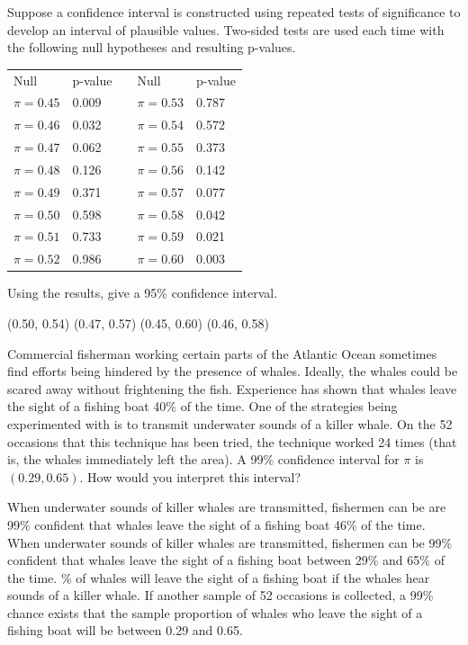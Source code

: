 \documentclass{article}
\begin{document}
\begin{mcquestions}
		\question Suppose a confidence interval is constructed using repeated tests of significance to develop an interval of plausible values.  Two-sided tests are used each time with the following null hypotheses and resulting p-values.
		\begin{center}
			\begin{tabular}{llp{.75in}ll}
				Null              & p-value & & Null              & p-value  \\
				$\pi = 0.45$ & 0.009   &                                 & $\pi = 0.53$ & 0.787    \\
				$\pi = 0.46$ & 0.032   &                                 & $\pi = 0.54$ & 0.572    \\
				$\pi = 0.47$ & 0.062   &                                 & $\pi = 0.55$ & 0.373    \\
				$\pi = 0.48$ & 0.126   &                                 & $\pi = 0.56$ & 0.142    \\
				$\pi = 0.49$ & 0.371   &                                 & $\pi = 0.57$ & 0.077    \\
				$\pi = 0.50$ & 0.598   &                                 & $\pi = 0.58$ & 0.042    \\
				$\pi = 0.51$ & 0.733   &                                 & $\pi = 0.59$ & 0.021    \\
				$\pi = 0.52$ & 0.986   &                                 & $\pi = 0.60$ & 0.003   
			\end{tabular}
		\end{center}
		Using the results, give a 95\% confidence interval.
		\begin{mcanswerslist}
			\answer (0.50, 0.54)
			\answer[correct] (0.47, 0.57)
			\answer (0.45, 0.60)
			\answer (0.46, 0.58)
		\end{mcanswerslist}
		
		\question Commercial fisherman working certain parts of the Atlantic Ocean sometimes find efforts being hindered by the presence of whales. Ideally, the whales could be scared away without frightening the fish. Experience has shown that whales leave the sight of a fishing boat 40\% of the time. One of the strategies being experimented with is to transmit underwater sounds of a killer whale. On the 52 occasions that this technique has been tried, the technique worked 24 times (that is, the whales immediately left the area).
		A 99\% confidence interval for $\pi$ is $(0.29, 0.65)$. How would you interpret this interval?
		\begin{mcanswerslist}
			\answer When underwater sounds of killer whales are transmitted, fishermen can be are 99\% confident that whales leave the sight of a fishing boat 46\% of the time.
			\answer[correct] When underwater sounds of killer whales are transmitted, fishermen can be 99\% confident that whales leave the sight of a fishing boat between 29\% and 65\% of the time.
			\% of whales will leave the sight of a fishing boat if the whales hear sounds of a killer whale.
			\answer If another sample of 52 occasions is collected, a 99\% chance exists that the sample proportion of whales who leave the sight of a fishing boat will be between 0.29 and 0.65.
		\end{mcanswerslist}
		

\end{mcquestions}
\end{document}
